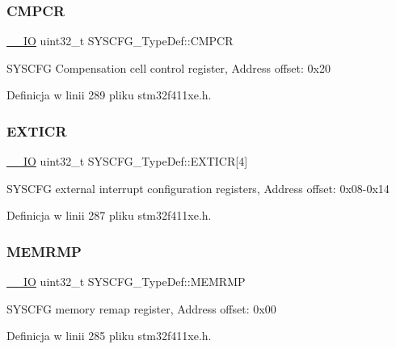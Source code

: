 \subsubsection{\texorpdfstring{C\+M\+P\+CR}{CMPCR}}
{\footnotesize\ttfamily \hyperlink{core__sc300_8h_aec43007d9998a0a0e01faede4133d6be}{\+\_\+\+\_\+\+IO} uint32\+\_\+t S\+Y\+S\+C\+F\+G\+\_\+\+Type\+Def\+::\+C\+M\+P\+CR}

S\+Y\+S\+C\+FG Compensation cell control register, Address offset\+: 0x20 

Definicja w linii 289 pliku stm32f411xe.\+h.

\mbox{\label{struct_s_y_s_c_f_g___type_def_a66a06b3aab7ff5c8fa342f7c1994bf7d}} 
\subsubsection{\texorpdfstring{E\+X\+T\+I\+CR}{EXTICR}}
{\footnotesize\ttfamily \hyperlink{core__sc300_8h_aec43007d9998a0a0e01faede4133d6be}{\+\_\+\+\_\+\+IO} uint32\+\_\+t S\+Y\+S\+C\+F\+G\+\_\+\+Type\+Def\+::\+E\+X\+T\+I\+CR\mbox{[}4\mbox{]}}

S\+Y\+S\+C\+FG external interrupt configuration registers, Address offset\+: 0x08-\/0x14 

Definicja w linii 287 pliku stm32f411xe.\+h.

\mbox{\label{struct_s_y_s_c_f_g___type_def_a85b9d3df2274b730327b181c402a7bf5}} 
\subsubsection{\texorpdfstring{M\+E\+M\+R\+MP}{MEMRMP}}
{\footnotesize\ttfamily \hyperlink{core__sc300_8h_aec43007d9998a0a0e01faede4133d6be}{\+\_\+\+\_\+\+IO} uint32\+\_\+t S\+Y\+S\+C\+F\+G\+\_\+\+Type\+Def\+::\+M\+E\+M\+R\+MP}

S\+Y\+S\+C\+FG memory remap register, Address offset\+: 0x00 

Definicja w linii 285 pliku stm32f411xe.\+h.

